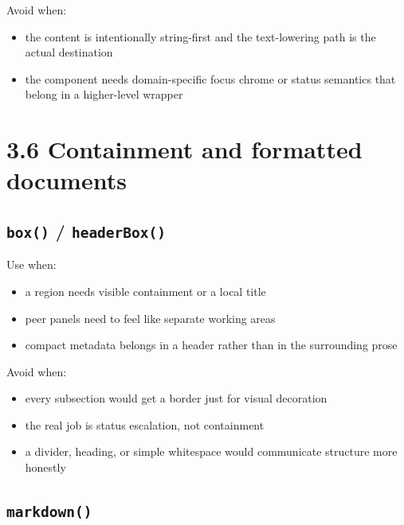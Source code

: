 Avoid when:

\begin{itemize}
\tightlist
\item
  the content is intentionally string-first and the text-lowering path is the actual destination
\item
  the component needs domain-specific focus chrome or status semantics that belong in a higher-level wrapper
\end{itemize}

\section{3.6 Containment and formatted documents}\label{record-023-containment-and-formatted-documents}

\subsection{\texorpdfstring{\texttt{b\allowbreak{}o\allowbreak{}x\allowbreak{}(\allowbreak{})} / \texttt{h\allowbreak{}e\allowbreak{}a\allowbreak{}d\allowbreak{}e\allowbreak{}r\allowbreak{}B\allowbreak{}o\allowbreak{}x\allowbreak{}(\allowbreak{})}}{ / }}\label{record-023-box-headerbox}

Use when:

\begin{itemize}
\tightlist
\item
  a region needs visible containment or a local title
\item
  peer panels need to feel like separate working areas
\item
  compact metadata belongs in a header rather than in the surrounding prose
\end{itemize}

Avoid when:

\begin{itemize}
\tightlist
\item
  every subsection would get a border just for visual decoration
\item
  the real job is status escalation, not containment
\item
  a divider, heading, or simple whitespace would communicate structure more honestly
\end{itemize}

\subsection{\texorpdfstring{\texttt{m\allowbreak{}a\allowbreak{}r\allowbreak{}k\allowbreak{}d\allowbreak{}o\allowbreak{}w\allowbreak{}n\allowbreak{}(\allowbreak{})}}{}}\label{record-023-markdown}

